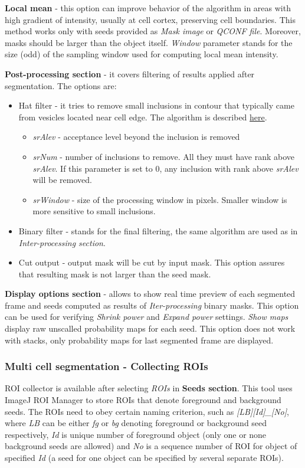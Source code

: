 \documentclass[a4paper,12pt]{article}
\begin{document}
\textbf{Local mean} - this option can improve behavior of the algorithm in areas with high gradient of intensity, usually at cell cortex, preserving cell boundaries. This method works only with seeds provided as \textit{Mask image} or \textit{QCONF file}. Moreover, masks should be larger than the object itself. \textit{Window} parameter stands for the size (odd) of the sampling window used for computing local mean intensity.   

\textbf{Post-processing section} - it covers filtering of results applied after segmentation. The options are:
\begin{itemize}
	\item Hat filter - it tries to remove small inclusions in contour that typically came from vesicles located near cell edge. The algorithm is described \href{https://pilip.lnx.warwick.ac.uk/site/apidocs/index.html}{here}.
	\begin{itemize}
		\item \textit{srAlev} - acceptance level beyond the inclusion is removed
		\item \textit{srNum} - number of inclusions to remove. All they must have rank above \textit{srAlev}. If this parameter is set to 0, any inclusion with rank above \textit{srAlev} will be removed. 
		\item \textit{srWindow} - size of the processing window in pixels. Smaller window is more sensitive to small inclusions. 
	\end{itemize} 
	\item Binary filter - stands for the final filtering, the same algorithm are used as in \textit{Inter-processing section}.
	\item Cut output - output mask will be cut by input mask. This option assures that resulting mask is not larger than the seed mask.
\end{itemize}

\textbf{Display options section} - allows to show real time preview of each segmented frame and seeds computed as results of \textit{Iter-processing} binary masks. This option can be used for verifying \textit{Shrink power} and \textit{Expand power} settings. \textit{Show maps} display raw unscalled probability maps for each seed. This option does not work with stacks, only probability maps for last segmented frame are displayed.  

\subsubsection{Multi cell segmentation - Collecting ROIs}
\label{sec:CollectingROIs}
ROI collector is available after selecting \textit{ROIs} in \textbf{Seeds section}. This tool uses ImageJ ROI Manager to store ROIs that denote foreground and background seeds. The ROIs need to obey certain naming criterion, such as \textit{[LB][Id]\_[No]}, where \textit{LB} can be either \textit{fg} or \textit{bg} denoting foreground or background seed respectively, \textit{Id} is unique number of foreground object (only one or none background seeds are allowed) and \textit{No} is a sequence number of ROI for object of specified \textit{Id} (a seed for one object can be specified by several separate ROIs). 
\end{document}
